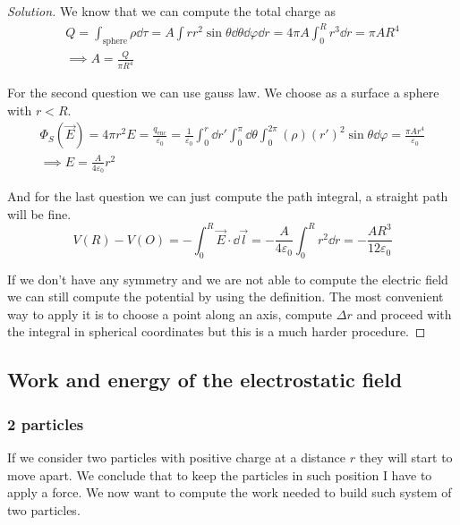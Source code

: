 \documentclass[12pt]{extarticle}
\begin{document}
\begin{proof}[Solution]
    We know that we can compute the total charge as
    \begin{gather}
        Q = \int_\text{sphere} \rho \dd{\tau} = A \int r r^2 \sin \theta \dd{\theta} \dd{\varphi} \dd{r} = 4 \pi A \int_0^R r^3 \dd{r} = \pi A R^4 \\
        \implies A = \frac{Q}{\pi R^4}
    \end{gather}

    For the second question we can use gauss law. We choose as a surface a sphere with $r < R$.
    \begin{gather}
        \Phi_S (\vec E) = 4 \pi r^2 E = \frac{q_\text{enc}}{\varepsilon_0} = \frac{1}{\varepsilon_0} \int_0^r \dd{r'} \int_0^\pi \dd{\theta} \int_0^{2 \pi} (\rho)(r')^2 \sin \theta \dd{\varphi}  = \frac{\pi A r^4}{\varepsilon_0} \\
        \implies E = \frac{A}{4 \varepsilon_0} r^2
    \end{gather}

    And for the last question we can just compute the path integral, a straight path will be fine.
    \begin{equation}
        V(R) - V(O) = - \int^R_0 \vec E \cdot \dd{\vec l} = - \frac{A}{4 \varepsilon_0} \int^R_0 r^2 \dd{r} = - \frac{AR^3}{12 \varepsilon_0}
    \end{equation}

    If we don't have any symmetry and we are not able to compute the electric field we can still compute the potential by using the definition.
    The most convenient way to apply it is to choose a point along an axis, compute $\Delta r$ and proceed with the integral in spherical coordinates but this is a much harder procedure.
\end{proof}

\subsection{Work and energy of the electrostatic field}

\subsubsection{2 particles}

If we consider two particles with positive charge at a distance $r$ they will start to move apart.
We conclude that to keep the particles in such position I have to apply a force.
We now want to compute the work needed to build such system of two particles.
\end{document}
